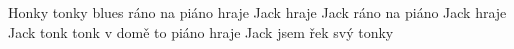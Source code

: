 \begin{TEXT}{Honky tonky blues}
\SLOKA[] ráno na piáno
hraje Jack hraje Jack
 ráno na piáno
 Jack hraje Jack
 tonk  tonk
  
\SLOKA[] v domě 
 to piáno 
 hraje Jack
 jsem řek
svý  tonky 
\end{TEXT}